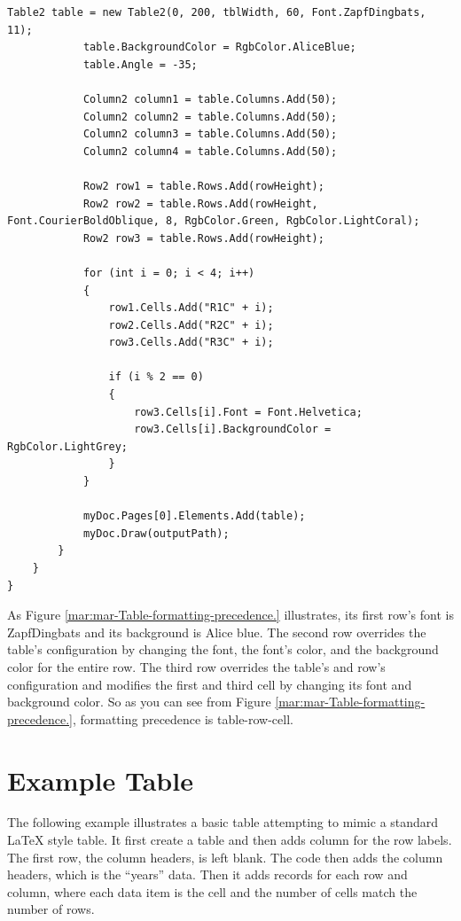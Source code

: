 \documentclass[american]{tufte-book}
\numberwithin{equation}{section}
\numberwithin{figure}{section}
\begin{document}
{\begin{lstlisting}[caption={Table formatting precedence.},label={lis:Table-formatting-precedence.},basicstyle={\footnotesize\ttfamily},breaklines=true]
            Table2 table = new Table2(0, 200, tblWidth, 60, Font.ZapfDingbats, 11);
            table.BackgroundColor = RgbColor.AliceBlue;
            table.Angle = -35;

            Column2 column1 = table.Columns.Add(50);
            Column2 column2 = table.Columns.Add(50);
            Column2 column3 = table.Columns.Add(50);
            Column2 column4 = table.Columns.Add(50);

            Row2 row1 = table.Rows.Add(rowHeight);
            Row2 row2 = table.Rows.Add(rowHeight, Font.CourierBoldOblique, 8, RgbColor.Green, RgbColor.LightCoral);
            Row2 row3 = table.Rows.Add(rowHeight);

            for (int i = 0; i < 4; i++)
            {
                row1.Cells.Add("R1C" + i);
                row2.Cells.Add("R2C" + i);
                row3.Cells.Add("R3C" + i);

                if (i % 2 == 0)
                {
                    row3.Cells[i].Font = Font.Helvetica;
                    row3.Cells[i].BackgroundColor = RgbColor.LightGrey;
                }
            }

            myDoc.Pages[0].Elements.Add(table);
            myDoc.Draw(outputPath);
        }
    }
}
\end{lstlisting}
\leavevmode\egroup

As Figure \ref{mar:mar-Table-formatting-precedence.} illustrates,
its first row's font is ZapfDingbats and its background is Alice blue.
The second row overrides the table's configuration by changing the
font, the font's color, and the background color for the entire row.
The third row overrides the table's and row's configuration and modifies
the first and third cell by changing its font and background color.
So as you can see from Figure \ref{mar:mar-Table-formatting-precedence.},
formatting precedence is table-row-cell.

\section{Example Table}

The following example illustrates a basic table attempting to mimic
a standard LaTeX style table. It first create a table and then adds
column for the row labels. The first row, the column headers, is left
blank. The code then adds the column headers, which is the ``years''
data. Then it adds records for each row and column, where each data
item is the cell and the number of cells match the number of rows.

}
\end{document}
